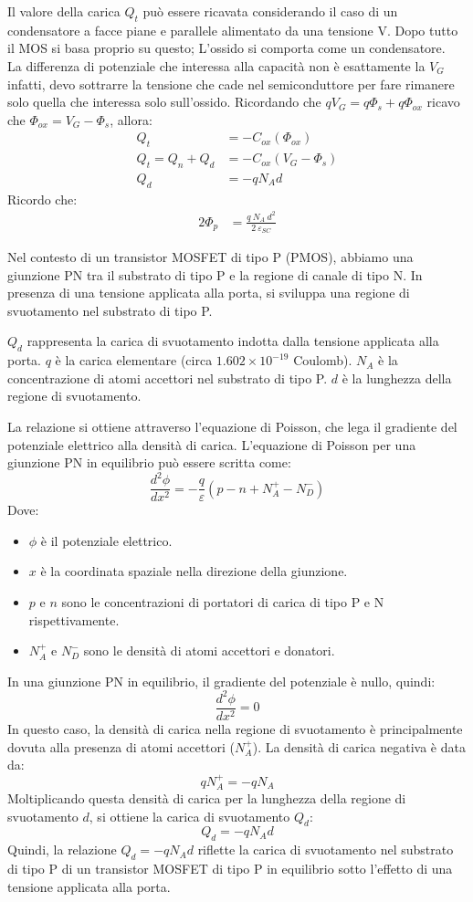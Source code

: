 Il valore della carica $Q_t$ può essere ricavata considerando il caso di un condensatore a facce piane e parallele alimentato da una tensione V. Dopo tutto il MOS si basa proprio su questo; L'ossido si comporta come un condensatore.\\
La differenza di potenziale che interessa alla capacità non è esattamente la $V_G$ infatti, devo sottrarre la tensione che cade nel semiconduttore per fare rimanere solo quella che interessa solo sull'ossido. Ricordando che $qV_G=q\Phi_s+q\Phi_{ox}$ ricavo che $\Phi_{ox}=V_G-\Phi_s$, allora:
\begin{align}
Q_t&={-C}_{ox}(\Phi_{ox})\\ \nonumber
    Q_t=Q_n+Q_d&={-C}_{ox}(V_G-\Phi_s)\\ 
Q_d&=-qN_A d
\end{align}
Ricordo che:
\begin{align}
{2\Phi}_p&=\frac{q\ N_A\ d^2}{2\ \varepsilon_{SC}}
\end{align}
%
\begin{ripasso}
Nel contesto di un transistor MOSFET di tipo P (PMOS), abbiamo una giunzione PN tra il substrato di tipo P e la regione di canale di tipo N. In presenza di una tensione applicata alla porta, si sviluppa una regione di svuotamento nel substrato di tipo P.

\(Q_d\) rappresenta la carica di svuotamento indotta dalla tensione applicata alla porta. \(q\) è la carica elementare (circa \(1.602 \times 10^{-19}\) Coulomb). \(N_A\) è la concentrazione di atomi accettori nel substrato di tipo P. \(d\) è la lunghezza della regione di svuotamento.

La relazione si ottiene attraverso l'equazione di Poisson, che lega il gradiente del potenziale elettrico alla densità di carica. L'equazione di Poisson per una giunzione PN in equilibrio può essere scritta come:
\[
\frac{d^2 \phi}{dx^2} = -\frac{q}{\varepsilon} (p - n + N_A^+ - N_D^-)
\]
Dove:
\begin{itemize}
    \item \(\phi\) è il potenziale elettrico.
    \item \(x\) è la coordinata spaziale nella direzione della giunzione.
    \item \(p\) e \(n\) sono le concentrazioni di portatori di carica di tipo P e N rispettivamente.
    \item \(N_A^+\) e \(N_D^-\) sono le densità di atomi accettori e donatori.
\end{itemize}

In una giunzione PN in equilibrio, il gradiente del potenziale è nullo, quindi:
\[
\frac{d^2 \phi}{dx^2} = 0
\]
In questo caso, la densità di carica nella regione di svuotamento è principalmente dovuta alla presenza di atomi accettori (\(N_A^+\)). La densità di carica negativa è data da:
\[
qN_A^+ = -qN_A
\]
Moltiplicando questa densità di carica per la lunghezza della regione di svuotamento \(d\), si ottiene la carica di svuotamento \(Q_d\):
\[
Q_d = -qN_A d
\]
Quindi, la relazione \(Q_d = -qN_A d\) riflette la carica di svuotamento nel substrato di tipo P di un transistor MOSFET di tipo P in equilibrio sotto l'effetto di una tensione applicata alla porta.

\end{ripasso}
